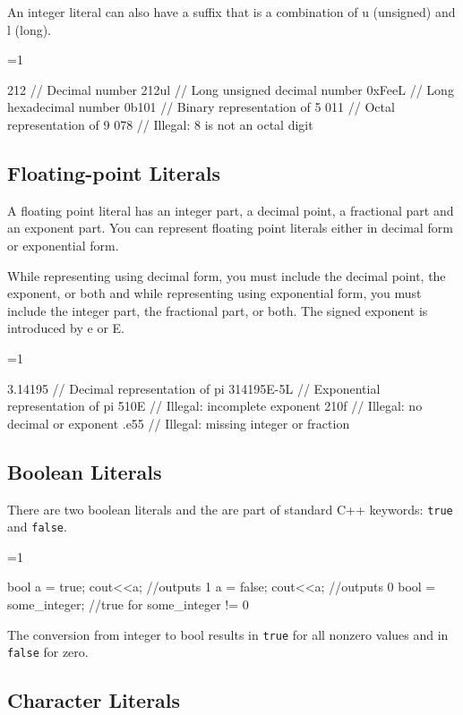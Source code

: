 \documentclass[10pt,a4paper]{scrartcl}
\gdef\conditionmacro{0}
\begin{document}
\begin{multicols*}{2}
An integer literal can also have a suffix that is a combination of u (unsigned) and l (long).

\ifnum\conditionmacro=1
\begin{TPCpp}
212     // Decimal number
212ul   // Long unsigned decimal number
0xFeeL  // Long hexadecimal number
0b101   // Binary representation of 5
011     // Octal representation of 9
078     // Illegal: 8 is not an octal digit
\end{TPCpp}
\fi

\subsection{Floating-point Literals}
\label{sec:FloatingPointLiterals}

A floating point literal has an integer part, a decimal point, a fractional part and an exponent part. You can represent floating point literals either in decimal form or exponential form.

While representing using decimal form, you must include the decimal point, the exponent, or both and while representing using exponential form, you must include the integer part, the fractional part, or both. The signed exponent is introduced by e or E.

\ifnum\conditionmacro=1
\begin{TPCpp}
3.14195      // Decimal representation of pi
314195E-5L   // Exponential representation of pi
510E         // Illegal: incomplete exponent
210f         // Illegal: no decimal or exponent
.e55         // Illegal: missing integer or fraction
\end{TPCpp}
\fi

\subsection{Boolean Literals}
\label{sec:BooleanLiterals}

There are two boolean literals and the are part of standard C++ keywords: \verb+true+ and \verb+false+.

\ifnum\conditionmacro=1
\begin{TPCpp}
bool a = true;
cout<<a; //outputs 1
a = false;
cout<<a; //outputs 0
bool = some_integer; //true for some_integer != 0
\end{TPCpp}
\fi

The conversion from integer to bool results in \verb+true+ for all nonzero values and in \verb+false+ for zero.

\subsection{Character Literals}
\label{sec:CharacterLiterals}


\end{multicols*}
\end{document}
